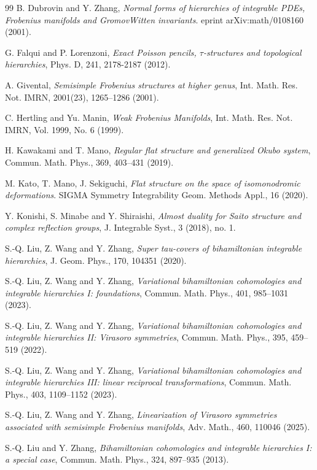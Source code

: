 \documentclass[11pt,a4paper]{amsart}
\numberwithin{equation}{section}
\numberwithin{equation}{section}
\begin{document}
\begin{thebibliography}{99}
B. Dubrovin and Y. Zhang, \emph{Normal forms of hierarchies of integrable PDEs, Frobenius manifolds and GromovWitten invariants}. eprint arXiv:math/0108160 (2001).

G. Falqui and P. Lorenzoni, \emph{Exact Poisson pencils, 
$\tau$-structures and topological hierarchies},
Phys. D, 241, 2178-2187 (2012).

A. Givental, \emph{Semisimple Frobenius structures at higher genus}, Int. Math. Res. Not. IMRN, 2001(23), 1265–1286 (2001).


 C. Hertling and Yu. Manin, \emph{Weak Frobenius Manifolds}, Int. Math. Res. Not. IMRN, Vol. 1999, No. 6 (1999).
 
 H. Kawakami and T. Mano, \emph{Regular flat structure and generalized Okubo system}, Commun. Math. Phys., 369, 403--431 (2019).
 
 M. Kato, T. Mano, J. Sekiguchi, \emph{Flat structure on the space of isomonodromic deformations}. SIGMA Symmetry Integrability Geom. Methods Appl.,  16 (2020).

Y. Konishi, S. Minabe and Y. Shiraishi, \emph{Almost duality for Saito structure and complex reflection groups}, J. Integrable Syst., 3 (2018), no. 1.

S.-Q. Liu, Z. Wang and Y. Zhang,  \emph{Super tau-covers of bihamiltonian integrable hierarchies}, J. Geom. Phys.,  170, 104351 (2020).

S.-Q. Liu, Z. Wang and Y. Zhang,  \emph{Variational bihamiltonian cohomologies and integrable hierarchies I: foundations}, Commun. Math. Phys., 401, 985–1031 (2023).

S.-Q. Liu, Z. Wang and Y. Zhang,  \emph{Variational bihamiltonian cohomologies and integrable hierarchies II: Virasoro symmetries}, Commun. Math. Phys., 395, 459–519 (2022).

S.-Q. Liu, Z. Wang and Y. Zhang,  \emph{Variational bihamiltonian cohomologies and integrable hierarchies III: linear reciprocal transformations}, Commun. Math. Phys., 403, 1109–1152 (2023).

S.-Q. Liu, Z. Wang and Y. Zhang,  \emph{Linearization of Virasoro symmetries associated with semisimple Frobenius manifolds}, Adv. Math., 460, 110046 (2025).

S.-Q. Liu and Y. Zhang,  \emph{Bihamiltonian cohomologies and integrable hierarchies I: a special case}, Commun. Math. Phys., 324, 897–935 (2013).


\end{thebibliography}
\end{document}
